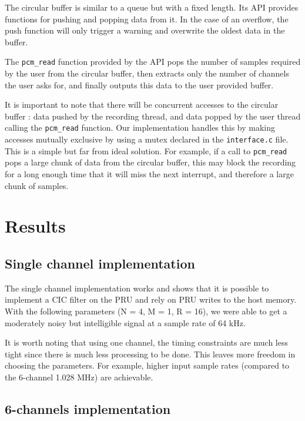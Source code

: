 \documentclass[]{report}
\begin{document}
The circular buffer is similar to a queue but with a fixed length. Its API provides functions for pushing and popping data from it. In the case of an overflow, the push function will only trigger a warning and overwrite the oldest data in the buffer.

The \texttt{pcm\_read} function provided by the API pops the number of samples required by the user from the circular buffer, then extracts only the number of channels the user asks for, and finally outputs this data to the user provided buffer.

It is important to note that there will be concurrent accesses to the circular buffer : data pushed by the recording thread, and data popped by the user thread calling the \texttt{pcm\_read} function. Our implementation handles this by making accesses mutually exclusive by using a mutex declared in the \texttt{interface.c} file. This is a simple but far from ideal solution. For example, if a call to \texttt{pcm\_read} pops a large chunk of data from the circular buffer, this may block the recording for a long enough time that it will miss the next interrupt, and therefore a large chunk of samples.

\hypertarget{results}{%
\chapter{Results}\label{results}}

\hypertarget{single-channel-implementation}{%
\section{Single channel
implementation}\label{single-channel-implementation}}

The single channel implementation works and shows that it is possible to implement a CIC filter on the PRU and rely on PRU writes to the host memory. With the following parameters (N = 4, M = 1, R = 16), we were able to get a moderately noisy but intelligible signal at a sample rate of 64 kHz.

It is worth noting that using one channel, the timing constraints are much less tight since there is much less processing to be done. This leaves more freedom in choosing the parameters. For example, higher input sample rates (compared to the 6-channel 1.028 MHz) are achievable.

\hypertarget{channels-implementation}{%
\section{6-channels implementation}\label{channels-implementation}}
\end{document}
